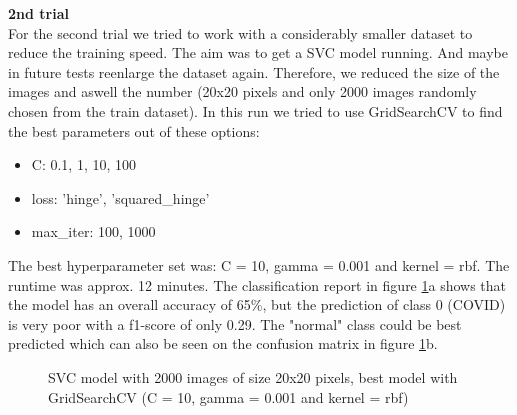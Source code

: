 \documentclass{article}
\begin{document}
\textbf{2nd trial}\\
For the second trial we tried to work with a considerably smaller dataset to reduce the training speed. The aim was to get a SVC model running. And maybe in future 
tests reenlarge the dataset again. Therefore, we reduced the size of the images and aswell the number (20x20 pixels and only 2000 images randomly chosen from the train 
dataset). In this run we tried to use GridSearchCV to find the best parameters out of these options: 
\begin{itemize}
    \item C: 0.1, 1, 10, 100
    \item loss: 'hinge', 'squared\_hinge'
    \item max\_iter: 100, 1000
\end{itemize}

The best hyperparameter set was: C = 10,  gamma = 0.001 and kernel = rbf. The runtime was approx. 12 minutes. The classification report in figure 
\ref{fig:SVC_2000_20x20_grid}a shows that the model has an overall accuracy of 65\%, but the prediction of class 0 (COVID) is very poor with a f1-score of only 0.29. The "normal" class could be best 
predicted which can also be seen on the confusion matrix in figure \ref{fig:SVC_2000_20x20_grid}b.

\begin{figure}[!ht]
  \centering
  \qquad
  \caption{SVC model with 2000 images of size 20x20 pixels, best model with GridSearchCV (C = 10,  gamma = 0.001 and kernel = rbf)}
  \label{fig:SVC_2000_20x20_grid}
\end{figure}
\end{document}
